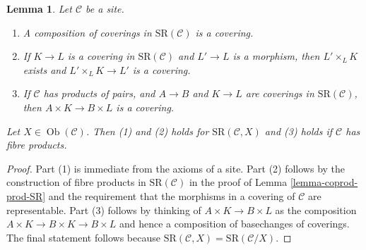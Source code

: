 \documentclass[10pt,a4paper]{amsart}
\theoremstyle{plain}
\newtheorem{lemma}[subsection]{Lemma}
\theoremstyle{definition}
\theoremstyle{remark}
\numberwithin{equation}{subsection}
\def\Ob{\mathop{\mathrm{Ob}}\nolimits}
\begin{document}
\begin{lemma}
\label{lemma-covering-permanence}
Let $\mathcal{C}$ be a site.
\begin{enumerate}
\item A composition of coverings in $\text{SR}(\mathcal{C})$
is a covering.
\item If $K \to L$ is a covering in $\text{SR}(\mathcal{C})$
and $L' \to L$ is a morphism, then $L' \times_L K$ exists
and $L' \times_L K \to L'$ is a covering.
\item If $\mathcal{C}$ has products of pairs, and
$A \to B$ and $K \to L$ are coverings in $\text{SR}(\mathcal{C})$,
then $A \times K \to B \times L$ is a covering.
\end{enumerate}
Let $X \in \Ob(\mathcal{C})$. Then (1) and (2) holds for
$\text{SR}(\mathcal{C}, X)$ and (3) holds if $\mathcal{C}$
has fibre products.
\end{lemma}

\begin{proof}
Part (1) is immediate from the axioms of a site.
Part (2) follows by the construction of fibre products
in $\text{SR}(\mathcal{C})$ in the proof of
Lemma \ref{lemma-coprod-prod-SR}
and the requirement that the morphisms in a covering
of $\mathcal{C}$ are representable.
Part (3) follows by thinking of $A \times K \to B \times L$
as the composition $A \times K \to B \times K \to B \times L$
and hence a composition of basechanges of coverings.
The final statement follows because $\text{SR}(\mathcal{C}, X) =
\text{SR}(\mathcal{C}/X)$.
\end{proof}
\end{document}
